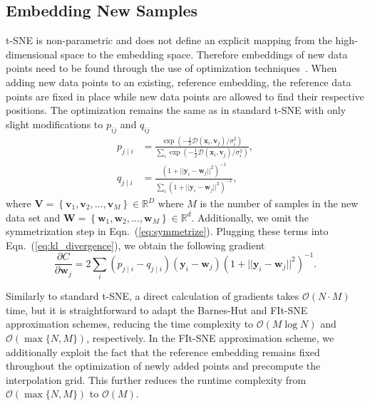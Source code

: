 \documentclass[letter]{article}
\newcommand{\opentsne}{\textsf{openTSNE}}
\begin{document}

\subsection*{Embedding New Samples}

t-SNE is non-parametric and does not define an explicit mapping from the
high-dimensional space to the embedding space. Therefore embeddings of new data
points need to be found through the use of optimization
techniques~\cite{policar2019embedding}. When adding new data points to an
existing, reference embedding, the reference data points are fixed in place
while new data points are allowed to find their respective positions. The
optimization remains the same as in standard t-SNE with only slight
modifications to $p_{ij}$ and $q_{ij}$
\begin{align}
p_{j \mid i} &= \frac{\exp \left ( -\frac{1}{2} \mathcal{D}(\mathbf{x}_i, \mathbf{v}_j) /  \sigma_i^2 \right )}{\sum_{i} \exp \left ( -\frac{1}{2} \mathcal{D}(\mathbf{x}_i, \mathbf{v}_j) / \sigma_i^2 \right )}, \\
q_{j \mid i} &= \frac{\left ( 1 + || \mathbf{y}_i - \mathbf{w}_j ||^2 \right )^{-1}}{\sum_{i}\left ( 1 + || \mathbf{y}_i - \mathbf{w}_j ||^2 \right )^{-1}},
\end{align}
\noindent where $\mathbf{V} = \left \{ \mathbf{v}_1, \mathbf{v}_2, \dots,
\mathbf{v}_M \right \} \in \mathbb{R}^D$ where $M$ is the number of samples in
the new data set and $\mathbf{W} = \left \{ \mathbf{w}_1, \mathbf{w}_2, \dots,
\mathbf{w}_M \right \} \in \mathbb{R}^d$. Additionally, we omit the
symmetrization step in Eqn.~(\ref{eq:symmetrize}). Plugging these terms into
Eqn.~(\ref{eq:kl_divergence}), we obtain the following gradient
\begin{equation}
\frac{\partial C}{\partial \mathbf{w}_j} = 2 \sum_i \left ( p_{j \mid i} - q_{j \mid i} \right ) \left ( \mathbf{y}_i - \mathbf{w}_j \right ) \left ( 1 + || \mathbf{y}_i - \mathbf{w}_j || ^2 \right )^{-1}.
\label{eq:gradient}
\end{equation}

Similarly to standard t-SNE, a direct calculation of gradients takes
$\mathcal{O}(N \cdot M)$ time, but it is straightforward to adapt the Barnes-Hut
and FIt-SNE approximation schemes, reducing the time complexity to
$\mathcal{O}(M \log N)$ and $\mathcal{O}(\max \{ N, M \})$, respectively. In the
FIt-SNE approximation scheme, we additionally exploit the fact that the
reference embedding remains fixed throughout the optimization of newly added
points and precompute the interpolation grid. This further reduces the runtime
complexity from $\mathcal{O}(\max \{ N, M \})$ to $\mathcal{O}(M)$.
\end{document}

